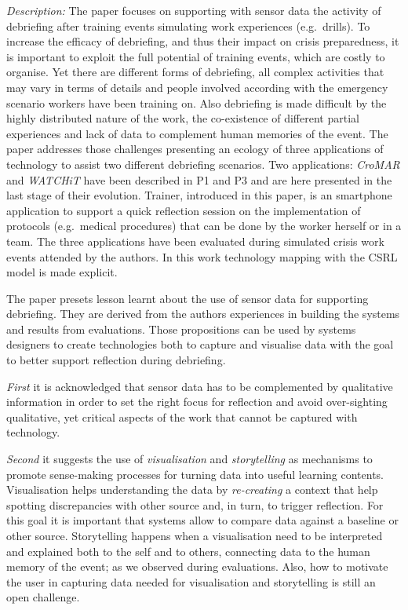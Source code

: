 \emph{Description:} The paper focuses on supporting with sensor data the
activity of debriefing after training events simulating work experiences
(e.g.~drills). To increase the efficacy of debriefing, and thus their
impact on crisis preparedness, it is important to exploit the full
potential of training events, which are costly to organise. Yet there
are different forms of debriefing, all complex activities that may vary
in terms of details and people involved according with the emergency
scenario workers have been training on. Also debriefing is made
difficult by the highly distributed nature of the work, the co-existence
of different partial experiences and lack of data to complement human
memories of the event. The paper addresses those challenges presenting
an ecology of three applications of technology to assist two different
debriefing scenarios. Two applications: \emph{CroMAR} and \emph{WATCHiT}
have been described in P1 and P3 and are here presented in the last
stage of their evolution. Trainer, introduced in this paper, is an
smartphone application to support a quick reflection session on the
implementation of protocols (e.g.~medical procedures) that can be done
by the worker herself or in a team. The three applications have been
evaluated during simulated crisis work events attended by the authors.
In this work technology mapping with the CSRL model is made explicit.

The paper presets lesson learnt about the use of sensor data for
supporting debriefing. They are derived from the authors experiences in
building the systems and results from evaluations. Those propositions
can be used by systems designers to create technologies both to capture
and visualise data with the goal to better support reflection during
debriefing.

\emph{First} it is acknowledged that sensor data has to be complemented
by qualitative information in order to set the right focus for
reflection and avoid over-sighting qualitative, yet critical aspects of
the work that cannot be captured with technology.

\emph{Second} it suggests the use of \emph{visualisation} and
\emph{storytelling} as mechanisms to promote sense-making processes for
turning data into useful learning contents. Visualisation helps
understanding the data by \emph{re-creating} a context that help
spotting discrepancies with other source and, in turn, to trigger
reflection. For this goal it is important that systems allow to compare
data against a baseline or other source. Storytelling happens when a
visualisation need to be interpreted and explained both to the self and
to others, connecting data to the human memory of the event; as we
observed during evaluations. Also, how to motivate the user in capturing
data needed for visualisation and storytelling is still an open
challenge.

